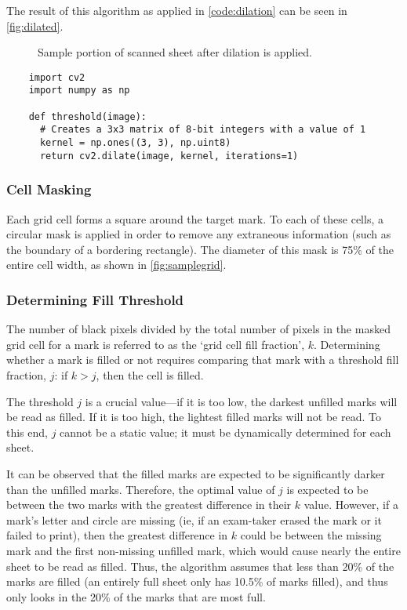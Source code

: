 \documentclass[12pt, letterpaper]{report}
\newcommand*{\itemref}[1]{\hyperref[{#1}]{\autoref*{#1}}}
\newcommand*{\boxedimage}[1]{\fbox{\texttt{[image: img/\#1]}}}
\newcommand{\fig}[3]{
  \begin{figure}[!htbp]
    \caption{#1}
    \label{#3}
    \centering
    \boxedimage{#2}
  \end{figure}
}
\begin{document}
The result of this algorithm as applied in \itemref{code:dilation} can be seen
in \itemref{fig:dilated}.

\fig{Sample portion of scanned sheet after dilation is applied.}{sample/dilated.jpg}{fig:dilated}

\begin{codesample}[!htbp]
  \caption{Simple dilation of an input image.}
  \label{code:dilation}
  \begin{verbatim}
    import cv2
    import numpy as np

    def threshold(image):
      # Creates a 3x3 matrix of 8-bit integers with a value of 1
      kernel = np.ones((3, 3), np.uint8)
      return cv2.dilate(image, kernel, iterations=1)
  \end{verbatim}
\end{codesample}

\subsubsection{Cell Masking}
\label{sect:mask}
Each grid cell forms a square around the target mark. To each of these cells, a
circular mask is applied in order to remove any extraneous information (such as
the boundary of a bordering rectangle). The diameter of this mask is 75\% of the
entire cell width, as shown in \itemref{fig:samplegrid}.

\subsubsection{Determining Fill Threshold}
The number of black pixels divided by the total number of pixels in the masked
grid cell for a mark is referred to as the `grid cell fill fraction', $k$. Determining
whether a mark is filled or not requires comparing that mark with a threshold
fill fraction, $j$: if $k>j$, then the cell is filled.

The threshold $j$ is a crucial value---if it is too low, the darkest unfilled marks will be
read as filled. If it is too high, the lightest filled marks will not be read.
To this end, $j$ cannot be a static value; it must be dynamically determined for
each sheet.

It can be observed that the filled marks are expected to be significantly darker
than the unfilled marks. Therefore, the optimal value of $j$ is expected to be
between the two marks with the greatest difference in their $k$ value. However,
if a mark's letter and circle are missing (ie, if an exam-taker erased the mark or
it failed to print), then the greatest difference in $k$ could be between the
missing mark and the first non-missing unfilled mark, which would cause nearly
the entire sheet to be read as filled. Thus, the algorithm assumes that less
than 20\% of the marks are filled (an entirely full sheet only has 10.5\% of
marks filled), and thus only looks in the 20\% of the marks that are most full.
\end{document}
